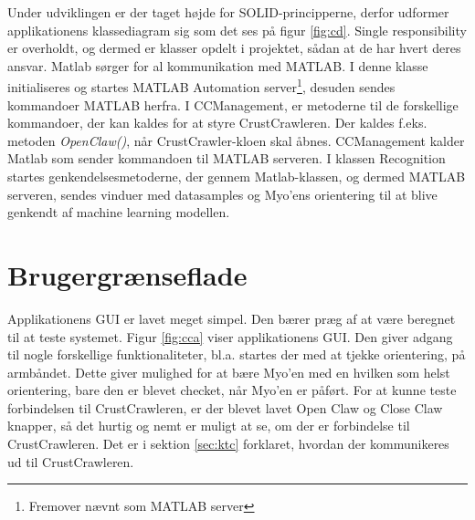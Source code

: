 
Under udviklingen er der taget højde for SOLID-principperne\citep{RefWorks:10}, derfor udformer applikationens klassediagram sig som det ses på figur \ref{fig:cd}. Single responsibility\citep{RefWorks:9} er overholdt, og dermed er klasser opdelt i projektet, sådan at de har hvert deres ansvar. Matlab sørger for al kommunikation med MATLAB. I denne klasse initialiseres og startes MATLAB Automation server\footnote{Fremover nævnt som MATLAB server}, desuden sendes kommandoer MATLAB herfra. I CCManagement, er metoderne til de forskellige kommandoer, der kan kaldes for at styre CrustCrawleren. Der kaldes f.eks. metoden \textit{OpenClaw()}, når CrustCrawler-kloen skal åbnes. CCManagement kalder Matlab som sender kommandoen til MATLAB serveren. I klassen Recognition startes genkendelsesmetoderne, der gennem Matlab-klassen, og dermed MATLAB serveren, sendes vinduer med datasamples og Myo'ens orientering til at blive genkendt af machine learning modellen.



\section{Brugergrænseflade}


Applikationens GUI er lavet meget simpel. Den bærer præg af at være beregnet til at teste systemet. Figur \ref{fig:cca} viser applikationens GUI. Den giver adgang til nogle forskellige funktionaliteter, bl.a. startes der med at tjekke orientering, på armbåndet. Dette giver mulighed for at bære Myo'en med en hvilken som helst orientering, bare den er blevet checket, når Myo'en er påført. For at kunne teste forbindelsen til CrustCrawleren, er der blevet lavet Open Claw og Close Claw knapper, så det hurtig og nemt er muligt at se, om der er forbindelse til CrustCrawleren. Det er i sektion \ref{sec:ktc} forklaret, hvordan der kommunikeres ud til CrustCrawleren.


